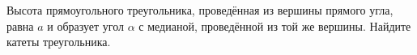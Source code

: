 \begin{ex}
	\begin{condition}
		Высота прямоугольного треугольника, проведённая из вершины прямого угла, равна \( a \) и образует угол \( \alpha \) с медианой, проведённой из той же вершины. Найдите катеты треугольника.
	\end{condition}
\end{ex}